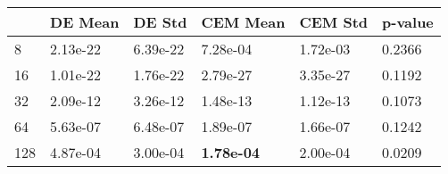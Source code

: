 \begin{tabular}{llllll}
\toprule
{} &   DE Mean &    DE Std &           CEM Mean &   CEM Std & p-value \\
\midrule
8   &  2.13e-22 &  6.39e-22 &           7.28e-04 &  1.72e-03 &  0.2366 \\
16  &  1.01e-22 &  1.76e-22 &           2.79e-27 &  3.35e-27 &  0.1192 \\
32  &  2.09e-12 &  3.26e-12 &           1.48e-13 &  1.12e-13 &  0.1073 \\
64  &  5.63e-07 &  6.48e-07 &           1.89e-07 &  1.66e-07 &  0.1242 \\
128 &  4.87e-04 &  3.00e-04 &  \textbf{1.78e-04} &  2.00e-04 &  0.0209 \\
\bottomrule
\end{tabular}

